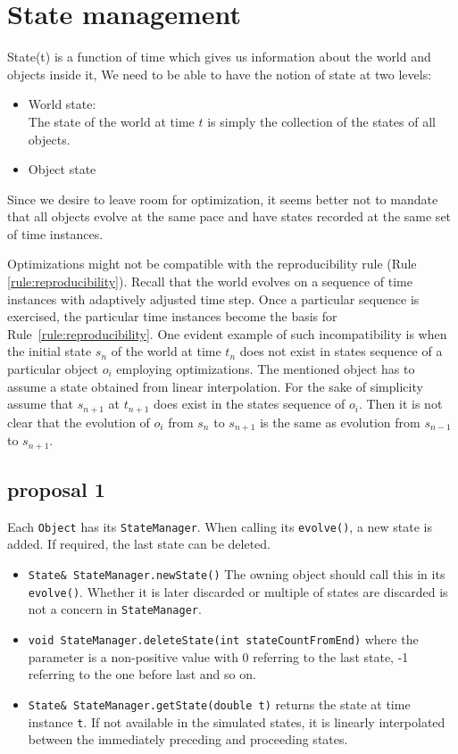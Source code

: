 \documentclass[a4paper]{report}
\begin{document}
\chapter{State management}
State(t) is a function of time which gives us information about the world and objects inside it,
We need to be able to have the notion of state at two levels:
\begin{itemize}
	\item World state:\\
	The state of the world at time $t$ is simply the collection of the states of all objects.
	\item Object state
\end{itemize}
  Since we desire to leave room for optimization, it seems better not to mandate that all objects evolve at the same pace and have states recorded at the same set of time instances.

Optimizations might not be compatible with the reproducibility rule (Rule \ref{rule:reproducibility}). Recall that the world evolves on a sequence of time instances with adaptively adjusted time step. Once a particular sequence is exercised, the particular time instances become the basis for Rule~\ref{rule:reproducibility}. One evident example of such incompatibility is when the initial state $s_n$ of the world at time $t_n$ does not exist in states sequence of a particular object $o_i$ employing optimizations. The mentioned object has to assume a state obtained from linear interpolation. For the sake of simplicity assume that $s_{n+1}$ at $t_{n+1}$ does exist in the states sequence of $o_i$. Then it is not clear that the evolution of $o_i$ from $s_n$ to $s_{n+1}$ is the same as evolution from $s_{n-1}$ to $s_{n+1}$. 

\section{proposal 1}
Each \verb+Object+ has its \verb+StateManager+. When calling its \verb+evolve()+, a new state is added. If required, the last state can be deleted. 

\begin{itemize}
	\item \verb+State& StateManager.newState()+ The owning object should call this in its \verb+evolve()+. Whether it is later discarded or multiple of states are discarded is not a concern in \verb+StateManager+.
	\item \verb+void StateManager.deleteState(int stateCountFromEnd)+ where the parameter is a non-positive value with 0 referring to the last state, -1 referring to the one before last and so on.
\item \verb+State& StateManager.getState(double t)+ returns the state at time instance \verb+t+. If not available in the simulated states, it is linearly interpolated between the immediately preceding and proceeding states.
\end{itemize}
\end{document}
